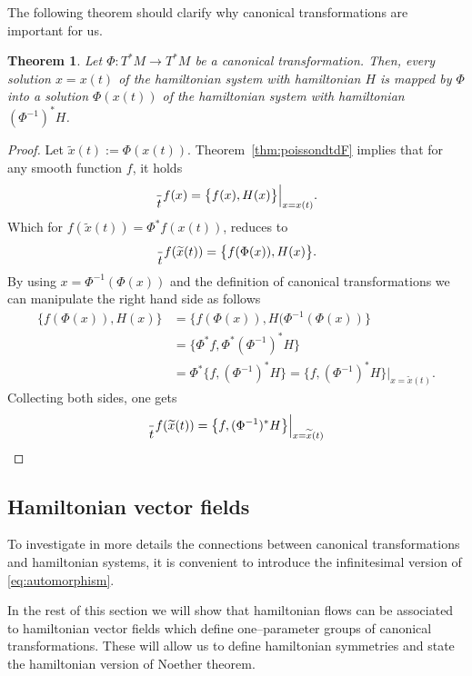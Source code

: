 \documentclass[english,fontsize=11pt,paper=a5,oneside]{scrbook}
\let\d\relax
\DeclareMathOperator{\d}{d}
\newtheorem{theorem}{Theorem}[chapter]
\theoremstyle{definition}
\begin{document}
The following theorem should clarify why canonical transformations are important for us.
\begin{theorem}\label{thm:canonicalmapping}
    Let $\Phi: T^*M \to T^* M$ be a canonical transformation.
    Then, every solution $x = x(t)$ of the hamiltonian system with hamiltonian $H$ is mapped by $\Phi$ into a solution $\Phi(x(t))$ of the hamiltonian system with hamiltonian $(\Phi^{-1})^* H$.
\end{theorem}
\begin{proof}
    Let $\widetilde x(t) := \Phi(x(t))$. Theorem~\ref{thm:poissondtdF} implies that for any smooth function $f$, it holds
    \begin{equation}
        \frac{\d}{\d t} f(x) = \big\{f(x), H(x)\big\}\Big|_{x=x(t)}.
    \end{equation}
    Which for $f(\widetilde x(t)) = \Phi^* f(x(t))$, reduces to
    \begin{equation}
        \frac{\d}{\d t} f(\widetilde x(t)) = \big\{f(\Phi(x)), H(x)\big\}.
    \end{equation}
    By using $x = \Phi^{-1}(\Phi(x))$ and the definition of canonical transformations we can manipulate the right hand side as follows
    \begin{align}
        \big\{f(\Phi(x)), H(x)\big\} &= \big\{f(\Phi(x)), H(\Phi^{-1}(\Phi(x))\big\} \\
        &= \big\{\Phi^* f, \Phi^* (\Phi^{-1})^* H\big\} \\
        &= \Phi^* \big\{f, (\Phi^{-1})^* H\big\} = \big\{f, (\Phi^{-1})^* H\big\}\Big|_{x=\widetilde x(t)}.
    \end{align}
    Collecting both sides, one gets
    \begin{equation}
        \frac{\d}{\d t} f(\widetilde x(t)) = \big\{f, (\Phi^{-1})^* H\big\}\Big|_{x=\widetilde x(t)}
    \end{equation}
\end{proof}

\subsection{Hamiltonian vector fields}

To investigate in more details the connections between canonical transformations and hamiltonian systems, it is convenient to introduce the infinitesimal version of \eqref{eq:automorphism}.

In the rest of this section we will show that hamiltonian flows can be associated to hamiltonian vector fields which define one--parameter groups of canonical transformations. These will allow us to define hamiltonian symmetries and state the hamiltonian version of Noether theorem.
\end{document}
